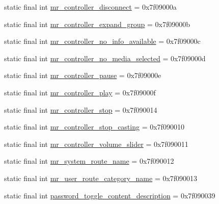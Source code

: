 \begin{CompactItemize}
\item 
static final int \hyperlink{classandroid_1_1support_1_1mediacompat_1_1_r_1_1string_2c70a4f419bde5449beea1f3226e08d8}{mr\_\-controller\_\-disconnect} = 0x7f09000a
\item 
static final int \hyperlink{classandroid_1_1support_1_1mediacompat_1_1_r_1_1string_60ed7555a8045c2a78de624e51793358}{mr\_\-controller\_\-expand\_\-group} = 0x7f09000b
\item 
static final int \hyperlink{classandroid_1_1support_1_1mediacompat_1_1_r_1_1string_850f0b86bb280c11e6aa19f27ed58d23}{mr\_\-controller\_\-no\_\-info\_\-available} = 0x7f09000c
\item 
static final int \hyperlink{classandroid_1_1support_1_1mediacompat_1_1_r_1_1string_d3922ae83de37accac4a9a276b19fb17}{mr\_\-controller\_\-no\_\-media\_\-selected} = 0x7f09000d
\item 
static final int \hyperlink{classandroid_1_1support_1_1mediacompat_1_1_r_1_1string_36795f3003e360b2cd5c658ceded41a2}{mr\_\-controller\_\-pause} = 0x7f09000e
\item 
static final int \hyperlink{classandroid_1_1support_1_1mediacompat_1_1_r_1_1string_af330bb4e4f551b23271d836721b749c}{mr\_\-controller\_\-play} = 0x7f09000f
\item 
static final int \hyperlink{classandroid_1_1support_1_1mediacompat_1_1_r_1_1string_beefe0ce8a2a2218b66ebe13fcafc69f}{mr\_\-controller\_\-stop} = 0x7f090014
\item 
static final int \hyperlink{classandroid_1_1support_1_1mediacompat_1_1_r_1_1string_b6466de7f5bb02aca09f4f88bfdf46b5}{mr\_\-controller\_\-stop\_\-casting} = 0x7f090010
\item 
static final int \hyperlink{classandroid_1_1support_1_1mediacompat_1_1_r_1_1string_91eaba17acb33a0fda588a79c4239cf2}{mr\_\-controller\_\-volume\_\-slider} = 0x7f090011
\item 
static final int \hyperlink{classandroid_1_1support_1_1mediacompat_1_1_r_1_1string_e79206cd0595dbef3c55c5a25d617994}{mr\_\-system\_\-route\_\-name} = 0x7f090012
\item 
static final int \hyperlink{classandroid_1_1support_1_1mediacompat_1_1_r_1_1string_9bad5bc76af0c24f578a85930a0559e3}{mr\_\-user\_\-route\_\-category\_\-name} = 0x7f090013
\item 
static final int \hyperlink{classandroid_1_1support_1_1mediacompat_1_1_r_1_1string_b6d9e5799ab6a5f327a488a767ac762d}{password\_\-toggle\_\-content\_\-description} = 0x7f090039
\item 

\end{CompactItemize}
